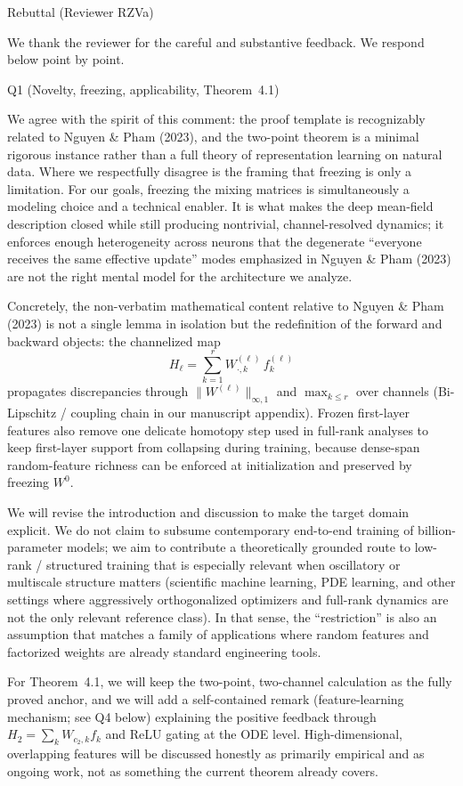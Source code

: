 Rebuttal (Reviewer RZVa)

We thank the reviewer for the careful and substantive feedback. We respond below point by point.

Q1 (Novelty, freezing, applicability, Theorem~4.1)

We agree with the spirit of this comment: the proof template is recognizably related to Nguyen \& Pham (2023), and the two-point theorem is a minimal rigorous instance rather than a full theory of representation learning on natural data. Where we respectfully disagree is the framing that freezing is only a limitation. For our goals, freezing the mixing matrices is simultaneously a modeling choice and a technical enabler. It is what makes the deep mean-field description closed while still producing nontrivial, channel-resolved dynamics; it enforces enough heterogeneity across neurons that the degenerate ``everyone receives the same effective update'' modes emphasized in Nguyen \& Pham (2023) are not the right mental model for the architecture we analyze.

Concretely, the non-verbatim mathematical content relative to Nguyen \& Pham (2023) is not a single lemma in isolation but the redefinition of the forward and backward objects: the channelized map
$$
H_\ell=\sum_{k=1}^r W^{(\ell)}_{\cdot,k}\,f_k^{(\ell)}
$$
propagates discrepancies through $\|W^{(\ell)}\|_{\infty,1}$ and $\max_{k\le r}$ over channels (Bi-Lipschitz / coupling chain in our manuscript appendix). Frozen first-layer features also remove one delicate homotopy step used in full-rank analyses to keep first-layer support from collapsing during training, because dense-span random-feature richness can be enforced at initialization and preserved by freezing $W^0$.

We will revise the introduction and discussion to make the target domain explicit. We do not claim to subsume contemporary end-to-end training of billion-parameter models; we aim to contribute a theoretically grounded route to low-rank / structured training that is especially relevant when oscillatory or multiscale structure matters (scientific machine learning, PDE learning, and other settings where aggressively orthogonalized optimizers and full-rank dynamics are not the only relevant reference class). In that sense, the ``restriction'' is also an assumption that matches a family of applications where random features and factorized weights are already standard engineering tools.

For Theorem~4.1, we will keep the two-point, two-channel calculation as the fully proved anchor, and we will add a self-contained remark (feature-learning mechanism; see Q4 below) explaining the positive feedback through $H_2=\sum_k W_{c_2,k} f_k$ and ReLU gating at the ODE level. High-dimensional, overlapping features will be discussed honestly as primarily empirical and as ongoing work, not as something the current theorem already covers.

